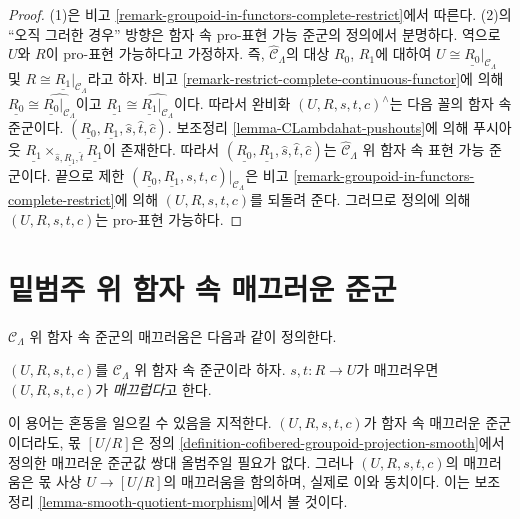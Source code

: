 \begin{proof}
(1)은 비고 \ref{remark-groupoid-in-functors-complete-restrict}에서 따른다.
(2)의 ``오직 그러한 경우'' 방향은 함자 속 pro-표현 가능 준군의 정의에서
분명하다. 역으로 $U$와 $R$이 pro-표현 가능하다고 가정하자. 즉,
$\widehat{\mathcal{C}}_\Lambda$의 대상 $R_0$, $R_1$에 대하여
$U \cong \underline{R_0}|_{\mathcal{C}_\Lambda}$ 및
$R \cong \underline{R_1}|_{\mathcal{C}_\Lambda}$라고 하자.
비고 \ref{remark-restrict-complete-continuous-functor}에 의해
$\underline{R_0} \cong \widehat{\underline{R_0}|_{\mathcal{C}_\Lambda}}$이고
$\underline{R_1} \cong \widehat{\underline{R_1}|_{\mathcal{C}_\Lambda}}$이다.
따라서 완비화 $(U, R, s, t, c)^\wedge$는 다음 꼴의 함자 속 준군이다.
$(\underline{R_0}, \underline{R_1}, \widehat{s}, \widehat{t}, \widehat{c})$.
보조정리 \ref{lemma-CLambdahat-pushouts}에 의해 푸시아웃
$\underline{R_1} \times_{\widehat{s}, \underline{R_1}, \widehat{t}}
\underline{R_1}$이 존재한다. 따라서
$(\underline{R_0}, \underline{R_1}, \widehat{s}, \widehat{t}, \widehat{c})$는
$\widehat{\mathcal{C}}_\Lambda$ 위 함자 속 표현 가능 준군이다.
끝으로 제한
$(\underline{R_0}, \underline{R_1}, s, t, c)|_{\mathcal{C}_\Lambda}$은
비고 \ref{remark-groupoid-in-functors-complete-restrict}에 의해
$(U, R, s, t, c)$를 되돌려 준다. 그러므로 정의에 의해
$(U, R, s, t, c)$는 pro-표현 가능하다.
\end{proof}





\section{밑범주 위 함자 속 매끄러운 준군}
\label{section-smooth-minimal-groupoids-in-functors}

\noindent
$\mathcal{C}_\Lambda$ 위 함자 속 준군의 매끄러움은 다음과 같이 정의한다.

\begin{definition}
\label{definition-smooth-groupoid-in-functors}
$(U, R, s, t, c)$를 $\mathcal{C}_\Lambda$ 위 함자 속 준군이라 하자.
$s, t: R \to U$가 매끄러우면 $(U, R, s, t, c)$가
{\it 매끄럽다}고 한다.
\end{definition}

\begin{remark}
\label{remark-smooth-groupoid-in-functors-warning}
이 용어는 혼동을 일으킬 수 있음을 지적한다.
$(U, R, s, t, c)$가 함자 속 매끄러운 준군이더라도, 몫
$[U/R]$은 정의 \ref{definition-cofibered-groupoid-projection-smooth}에서
정의한 매끄러운 준군값 쌍대 올범주일 필요가 없다.
그러나 $(U, R, s, t, c)$의 매끄러움은 몫 사상
$U \to [U/R]$의 매끄러움을 함의하며, 실제로 이와 동치이다. 이는
보조정리 \ref{lemma-smooth-quotient-morphism}에서 볼 것이다.
\end{remark}

